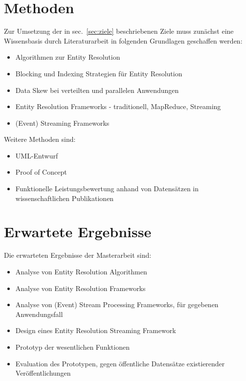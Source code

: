 \documentclass[%
	paper=A4,					%
	twoside=true,				%
	openright,					%
	parskip=full,				%
	chapterprefix=true,			%
	11pt,						%
	headings=normal,			%
	bibliography=totoc,			%
	listof=totoc,				%
	titlepage=on,				%
	captions=tableabove,		%
	draft=false,				%
]{scrreprt}%
\providecommand{\tightlist}{%
    \setlength{\itemsep}{0pt}\setlength{\parskip}{0pt}}
\begin{document}
\chapter{Methoden}\label{methoden}

Zur Umsetzung der in sec.~\ref{sec:ziele} beschriebenen Ziele muss
zunächst eine Wissensbasis durch Literaturarbeit in folgenden Grundlagen
geschaffen werden:

\begin{itemize}
\tightlist
\item
  Algorithmen zur Entity Resolution
\item
  Blocking und Indexing Strategien für Entity Resolution
\item
  Data Skew bei verteilten und parallelen Anwendungen
\item
  Entity Resolution Frameworks - traditionell, MapReduce, Streaming
\item
  (Event) Streaming Frameworks
\end{itemize}

Weitere Methoden sind:

\begin{itemize}
\tightlist
\item
  UML-Entwurf
\item
  Proof of Concept
\item
  Funktionelle Leistungsbewertung anhand von Datensätzen in
  wissenschaftlichen Publikationen
\end{itemize}

\chapter{Erwartete Ergebnisse}\label{erwartete-ergebnisse}

Die erwarteten Ergebnisse der Masterarbeit sind:

\begin{itemize}
\tightlist
\item
  Analyse von Entity Resolution Algorithmen
\item
  Analyse von Entity Resolution Frameworks
\item
  Analyse von (Event) Stream Processing Frameworks, für gegebenen
  Anwendungsfall
\item
  Design eines Entity Resolution Streaming Framework
\item
  Prototyp der wesentlichen Funktionen
\item
  Evaluation des Prototypen, gegen öffentliche Datensätze existierender
  Veröffentlichungen
\end{itemize}
\end{document}
